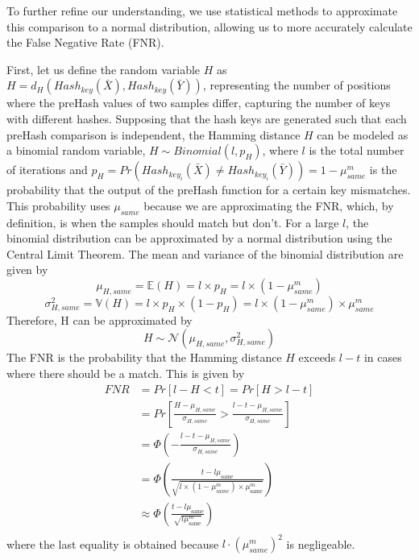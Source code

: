 To further refine our understanding, we use statistical methods to approximate this comparison to a normal distribution, allowing us to more accurately calculate the False Negative Rate (FNR). %


First, let us define the random variable $H$ as \(H = d_H(Hash_{key}(\bar{X}), Hash_{key}(\bar{Y}))\), representing the number of positions where the preHash values of two samples differ, capturing the number of keys with different hashes. Supposing that the hash keys are generated such that each preHash comparison is independent, the Hamming distance $H$ can be modeled as a binomial random variable, \(H \sim Binomial(l, p_H)\), where $l$ is the total number of iterations and $p_H = Pr(Hash_{key_i}(\bar{X}) \neq Hash_{key_i}(\bar{Y})) = 1 - \mu_{same}^m$ is the probability that the output of the preHash function for a certain key mismatches. This probability uses $\mu_{same}$ because we are approximating the FNR, which, by definition, is when the samples should match but don't. 
\newline For a large $l$, the binomial distribution can be approximated by a normal distribution using the Central Limit Theorem. The mean and variance of the binomial distribution are given by
\[
\mu_{H, same} = \mathbb{E}(H) = l \times p_H = l \times (1 - \mu_{same}^m)    
\]
\[
\sigma_{H, same}^2 = \mathbb{V}(H) = l \times p_H \times (1 - p_H) = l \times (1 - \mu_{same}^m) \times \mu_{same}^m    
\]
Therefore, H can be approximated by
\[
H \sim \mathcal{N}(\mu_{H, same}, \sigma_{H, same}^2)    
\]
The FNR is the probability that the Hamming distance $H$ exceeds $l - t$ in cases where there should be a match. This is given by
\begin{equation}
    \begin{aligned}
        \label{eq:fnr}
        FNR &= Pr[l - H < t] = Pr[H > l - t] \\
        &= Pr\left[\frac{H - \mu_{H, same}}{\sigma_{H, same}} > \frac{l - t - \mu_{H, same}}{\sigma_{H, same}}\right] \\
        &= \Phi \left( - \frac{l - t - \mu_{H, same}}{\sigma_{H, same}}\right) \\
        &= \Phi \left(\frac{t - l\mu_{\text{same}}}{\sqrt{l \times (1 - \mu_{same}^m) \times \mu_{\text{same}}^m}}\right) \\
        &\approx \Phi \left(\frac{t - l\mu_{\text{same}}}{\sqrt{l\mu_{\text{same}}^m}}\right) \\
    \end{aligned}        
\end{equation}
where the last equality is obtained because $l\cdot(\mu_{same}^m)^2$ is negligeable. 

